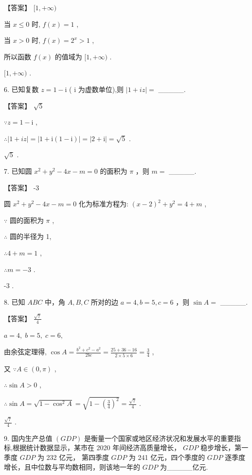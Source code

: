 \documentclass[10pt]{article}
\begin{document}
【答案】 \(\lbrack 1, + \infty )\)

当 \(x \leq  0\) 时, \(f\left( x\right)  = 1\) ,

当 \(x > 0\) 时, \(f\left( x\right)  = {2}^{x} > 1\) ,

所以函数 \(f\left( x\right)\) 的值域为 \(\lbrack 1, + \infty )\) .

\(\lbrack 1, + \infty )\) .

6. 已知复数 \(z = 1 - \mathrm{i}\) ( \(\mathrm{i}\) 为虚数单位),则 \(\left| {1 + {iz}}\right|  =\) \_\_\_\_\_.

【答案】 \(\sqrt{5}\)

\(\because z = 1 - \mathrm{i}\) ,

\(\therefore \left| {1 + {iz}}\right|  = \left| {1 + \mathrm{i}\left( {1 - \mathrm{i}}\right) }\right|  = \left| {2 + \mathrm{i}}\right|  = \sqrt{5}\) .

\(\sqrt{5}\) .

7. 已知圆 \({x}^{2} + {y}^{2} - {4x} - m = 0\) 的面积为 \(\pi\) ，则 \(m =\) \_\_\_\_\_.

【答案】 -3

圆 \({x}^{2} + {y}^{2} - {4x} - m = 0\) 化为标准方程为: \({\left( x - 2\right) }^{2} + {y}^{2} = 4 + m\) ,

\(\because\) 圆的面积为 \(\pi\) ,

\(\therefore\) 圆的半径为 1,

\(\therefore 4 + m = 1\) ,

\(\therefore m =  - 3\) .

-3 .

8. 已知 \({ABC}\) 中，角 \(A,B,C\) 所对的边 \(a = 4,b = 5,c = 6\) ，则 \(\sin A =\) \_\_\_\_\_.

【答案】 \(\frac{\sqrt{7}}{4}\)

\(a = 4,\;b = 5,\;c = 6,\)

由余弦定理得, \(\cos A = \frac{{b}^{2} + {c}^{2} - {a}^{2}}{2bc} = \frac{{25} + {36} - {16}}{2 \times  5 \times  6} = \frac{3}{4}\) ,

又 \(\because A \in  \left( {0,\pi }\right)\) ,

\(\therefore \sin A > 0\) ,

\(\therefore \sin A = \sqrt{1 - {\cos }^{2}A} = \sqrt{1 - {\left( \frac{3}{4}\right) }^{2}} = \frac{\sqrt{7}}{4}\) .

\(\frac{\sqrt{7}}{4}\) .

9. 国内生产总值 \(\left( {GDP}\right)\) 是衡量一个国家或地区经济状况和发展水平的重要指标,根据统计数据显示，某市在 2020 年间经济高质量增长， \({GDP}\) 稳步增长，第一季度 \({GDP}\) 为 232 亿元， 第四季度 \({GDP}\) 为 241 亿元，四个季度的 \({GDP}\) 逐季度增长，且中位数与平均数相同，则该地一年的 \({GDP}\) 为\_\_\_\_\_亿元.
\end{document}
